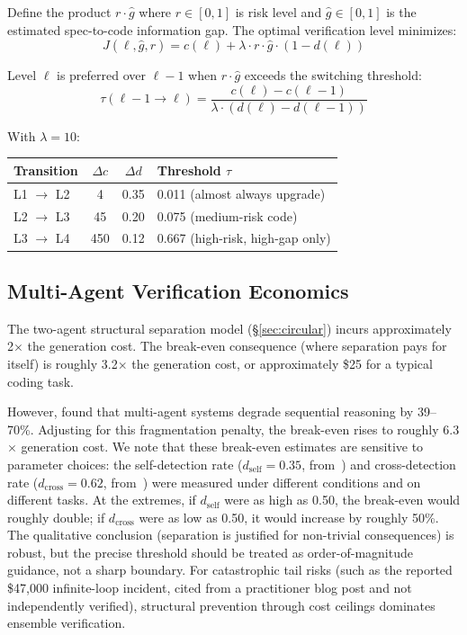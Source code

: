 \documentclass[11pt, a4paper, logo, copyright]{googledeepmind}
\begin{document}
Define the product $r \cdot \hat{g}$ where $r \in [0,1]$ is risk level and $\hat{g} \in [0,1]$ is the estimated spec-to-code information gap.
The optimal verification level minimizes:
\begin{equation}
J(\ell, \hat{g}, r) = c(\ell) + \lambda \cdot r \cdot \hat{g} \cdot (1 - d(\ell))
\end{equation}

Level $\ell$ is preferred over $\ell - 1$ when $r \cdot \hat{g}$ exceeds the switching threshold:
\begin{equation}
\tau(\ell{-}1 \to \ell) = \frac{c(\ell) - c(\ell{-}1)}{\lambda \cdot (d(\ell) - d(\ell{-}1))}
\end{equation}

With $\lambda = 10$:

\begin{center}
\begin{tabular}{lccl}
\toprule
Transition & $\Delta c$ & $\Delta d$ & Threshold $\tau$ \\
\midrule
L1 $\to$ L2 & 4 & 0.35 & 0.011 (almost always upgrade) \\
L2 $\to$ L3 & 45 & 0.20 & 0.075 (medium-risk code) \\
L3 $\to$ L4 & 450 & 0.12 & 0.667 (high-risk, high-gap only) \\
\bottomrule
\end{tabular}
\end{center}

\subsection{Multi-Agent Verification Economics}

The two-agent structural separation model (\S\ref{sec:circular}) incurs approximately 2$\times$ the generation cost.
The break-even consequence (where separation pays for itself) is roughly 3.2$\times$ the generation cost, or approximately \$25 for a typical coding task.

However, \citet{google2025scaling} found that multi-agent systems degrade sequential reasoning by 39--70\%.
Adjusting for this fragmentation penalty, the break-even rises to roughly 6.3$\times$ generation cost.
We note that these break-even estimates are sensitive to parameter choices: the self-detection rate ($d_{\text{self}} = 0.35$, from~\citealt{selfverification2025}) and cross-detection rate ($d_{\text{cross}} = 0.62$, from~\citealt{hariharan2025plan}) were measured under different conditions and on different tasks.
At the extremes, if $d_{\text{self}}$ were as high as 0.50, the break-even would roughly double; if $d_{\text{cross}}$ were as low as 0.50, it would increase by roughly 50\%.
The qualitative conclusion (separation is justified for non-trivial consequences) is robust, but the precise threshold should be treated as order-of-magnitude guidance, not a sharp boundary.
For catastrophic tail risks (such as the reported \$47{,}000 infinite-loop incident, cited from a practitioner blog post and not independently verified), structural prevention through cost ceilings dominates ensemble verification.
\end{document}
